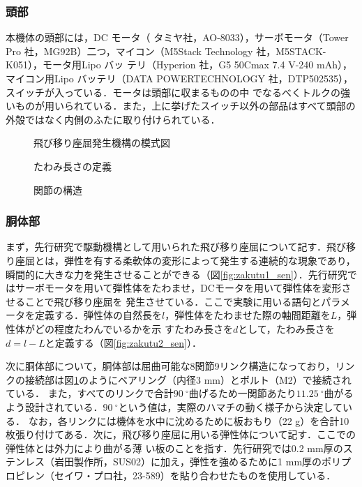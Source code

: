 \subsubsection{頭部}
本機体の頭部には，DC モータ（ タミヤ社，AO-8033），サーボモータ（Tower Pro 社，MG92B）二つ，マイコン（M5Stack Technology 社，M5STACK-K051），モータ用Lipo バッ
テリ（Hyperion 社，G5 50Cmax 7.4 V-240 mAh），マイコン用Lipo バッテリ（DATA POWERTECHNOLOGY 社，DTP502535），スイッチが入っている．モータは頭部に収まるものの中
でなるべくトルクの強いものが用いられている．また，上に挙げたスイッチ以外の部品はすべて頭部の外殻ではなく内側のふたに取り付けられている．

\begin{figure}[t]
    \centering
     \begin{minipage}[b]{0.45\linewidth}
        \centering
        \caption{飛び移り座屈発生機構の模式図\cite{kyu}}
        \label{fig:zakutu1_sen}
     \end{minipage}
     \begin{minipage}[b]{0.35\linewidth}
        \centering
        \caption{たわみ長さの定義\cite{kyu}}
        \label{fig:zakutu2_sen}
     \end{minipage}
     \begin{minipage}[b]{0.15\linewidth}
        \centering
        \caption{関節の構造\cite{kyu}}
        \label{fig:kansetu}
     \end{minipage}
\end{figure}

\subsubsection{胴体部}
まず，先行研究\cite{kyu}で駆動機構として用いられた飛び移り座屈について記す．飛び移り座屈とは，弾性を有する柔軟体の変形によって発生する連続的な現象であり，
瞬間的に大きな力を発生させることができる（図\ref{fig:zakutu1_sen}）．先行研究ではサーボモータを用いて弾性体をたわませ，DCモータを用いて弾性体を変形させることで飛び移り座屈を
発生させている．ここで実験に用いる語句とパラメータを定義する．弾性体の自然長を$l$，弾性体をたわませた際の軸間距離を$L$，弾性体がどの程度たわんでいるかを示
すたわみ長さを$d$として，たわみ長さを$d=l−L$と定義する（図\ref{fig:zakutu2_sen}）．

次に胴体部について，胴体部は屈曲可能な8関節9リンク構造になっており，リンクの接続部は図\ref{fig:kansetu}のようにベアリング（内径3 mm）とボルト（M2）で接続されている．
また，すべてのリンクで合計$90\:^\circ$曲げるため一関節あたり$11.25\:^\circ$曲がるよう設計されている．$90\:^\circ$という値は，実際のハマチの動く様子から決定している．
なお，各リンクには機体を水中に沈めるために板おもり（22 g）を合計10 枚張り付けてある．次に，飛び移り座屈に用いる弾性体について記す．ここでの弾性体とは外力により曲がる薄
い板のことを指す．先行研究では0.2 mm厚のステンレス（岩田製作所，SUS02）に加え，弾性を強めるために1 mm厚のポリプロピレン（セイワ・プロ社，23-589）を貼り合わせたものを使用している．

